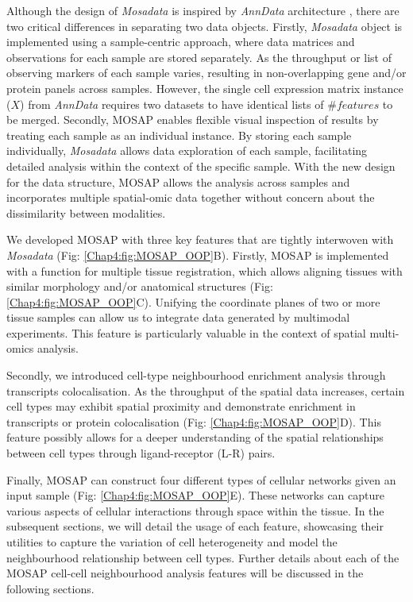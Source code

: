 Although the design of \textit{Mosadata} is inspired by \textit{AnnData} architecture \cite{wolf2018scanpy}, there are two critical differences in separating two data objects. Firstly, \textit{Mosadata} object is implemented using a sample-centric approach, where data matrices and observations for each sample are stored separately. As the throughput or list of observing markers of each sample varies, resulting in non-overlapping gene and/or protein panels across samples. However, the single cell expression matrix instance ($X$) from \textit{AnnData} requires two datasets to have identical lists of $\#features$ to be merged. Secondly, MOSAP enables flexible visual inspection of results by treating each sample as an individual instance. By storing each sample individually, \textit{Mosadata} allows data exploration of each sample, facilitating detailed analysis within the context of the specific sample. With the new design for the data structure, MOSAP allows the analysis across samples and incorporates multiple spatial-omic data together without concern about the dissimilarity between modalities.

We developed MOSAP with three key features that are tightly interwoven with \textit{Mosadata} (Fig: \ref{Chap4:fig:MOSAP_OOP}B). Firstly, MOSAP is implemented with a function for multiple tissue registration, which allows aligning tissues with similar morphology and/or anatomical structures (Fig: \ref{Chap4:fig:MOSAP_OOP}C). Unifying the coordinate planes of two or more tissue samples can allow us to integrate data generated by multimodal experiments. This feature is particularly valuable in the context of spatial multi-omics analysis.

Secondly, we introduced cell-type neighbourhood enrichment analysis through transcripts colocalisation. As the throughput of the spatial data increases, certain cell types may exhibit spatial proximity and demonstrate enrichment in transcripts or protein colocalisation (Fig: \ref{Chap4:fig:MOSAP_OOP}D). This feature possibly allows for a deeper understanding of the spatial relationships between cell types through ligand-receptor (L-R) pairs.

Finally, MOSAP can construct four different types of cellular networks given an input sample (Fig: \ref{Chap4:fig:MOSAP_OOP}E). These networks can capture various aspects of cellular interactions through space within the tissue. In the subsequent sections, we will detail the usage of each feature, showcasing their utilities to capture the variation of cell heterogeneity and model the neighbourhood relationship between cell types. Further details about each of the MOSAP cell-cell neighbourhood analysis features will be discussed in the following sections. 

